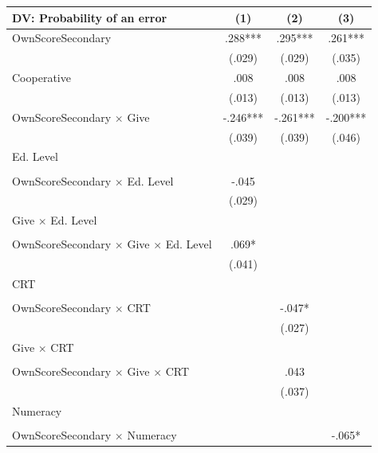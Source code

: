 \begingroup
\centering
\begin{tabular*}{.84\linewidth}{@{\extracolsep{\fill}}lccc}
   \toprule
   DV: Probability of an error & \multicolumn{1}{c}{(1)} & \multicolumn{1}{c}{(2)} & \multicolumn{1}{c}{(3)}\\
   \midrule
   OwnScoreSecondary & \mbox{\hphantom{8}.288***} & \mbox{\hphantom{8}.295***} & \mbox{\hphantom{8}.261***}\\
    & \mbox{(.029)\hphantom{88}} & \mbox{(.029)\hphantom{88}} & \mbox{(.035)\hphantom{88}}\\
   Cooperative & \mbox{\hphantom{8}.008\hphantom{888}} & \mbox{\hphantom{8}.008\hphantom{888}} & \mbox{\hphantom{8}.008\hphantom{888}}\\
    & \mbox{(.013)\hphantom{88}} & \mbox{(.013)\hphantom{88}} & \mbox{(.013)\hphantom{88}}\\
   OwnScoreSecondary $\times$ Give & \mbox{-.246***} & \mbox{-.261***} & \mbox{-.200***}\\
    & \mbox{(.039)\hphantom{88}} & \mbox{(.039)\hphantom{88}} & \mbox{(.046)\hphantom{88}}\\
   Ed. Level &  &  & \\
    &  &  & \\
   OwnScoreSecondary $\times$ Ed. Level & \mbox{-.045\hphantom{888}} &  & \\
    & \mbox{(.029)\hphantom{88}} &  & \\
   Give $\times$ Ed. Level &  &  & \\
    &  &  & \\
   OwnScoreSecondary $\times$ Give $\times$ Ed. Level & \mbox{\hphantom{8}.069*\hphantom{88}} &  & \\
    & \mbox{(.041)\hphantom{88}} &  & \\
   CRT &  &  & \\
    &  &  & \\
   OwnScoreSecondary $\times$ CRT &  & \mbox{-.047*\hphantom{88}} & \\
    &  & \mbox{(.027)\hphantom{88}} & \\
   Give $\times$ CRT &  &  & \\
    &  &  & \\
   OwnScoreSecondary $\times$ Give $\times$ CRT &  & \mbox{\hphantom{8}.043\hphantom{888}} & \\
    &  & \mbox{(.037)\hphantom{88}} & \\
   Numeracy &  &  & \\
    &  &  & \\
   OwnScoreSecondary $\times$ Numeracy &  &  & \mbox{-.065*\hphantom{88}}\\

\end{tabular*}
